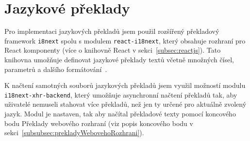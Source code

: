 
\section{Jazykové překlady}\label{sec:jazykovéPřeklady}

Pro implementaci jazykových překladů jsem použil rozšířený překladový framework \texttt{i8next} spolu s modulem \texttt{react-i18next}, který obsahuje rozhraní pro React komponenty (více o knihovně React v sekci~\ref{subsec:reactjs}).
Tato knihovna umožňuje definovat jazykové překlady textů včetně množných čísel, parametrů a dalšího formátování~\cite{i8next:docs}.

K načtení samotných souborů jazykových překladů jsem využil možností modulu \texttt{i18next-xhr-backend}, který umožňuje asynchronní načtení překladů tak, aby uživatelé nemuseli stahovat více překladů, než jen ty určené pro aktuálně zvolený jazyk.
Modul je nastaven, tak aby načítal překladové texty pomocí koncového bodu Překlady webového rozhraní (viz popis koncového bodu v sekci~\ref{subsubsec:prekladyWebovehoRozhrani}).
